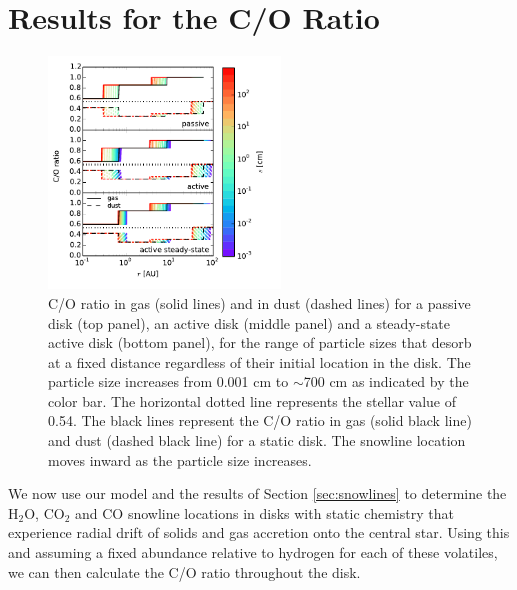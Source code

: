 \documentclass[apj]{emulateapj}
\newcommand{\emgr}[1]{\emph{ \color{gray} #1}}
\begin{document}


\section{Results for the C/O Ratio}
\label{sec:COratio}

\begin{figure}[h!]
\centering
\includegraphics[width=0.55\textwidth]{C_O_ratio_passive_active_disk_many_colorbar_complete.pdf}
\caption{C/O ratio in gas (solid lines) and in dust (dashed lines) for a passive disk (top panel), an active disk (middle panel) and a steady-state active disk (bottom panel), for the range of particle sizes that desorb at a fixed distance regardless of their initial location in the disk. The particle size increases from 0.001 cm to $\sim$700 cm as indicated by the color bar. The horizontal dotted line represents the stellar value of 0.54. The black lines represent the C/O ratio in gas (solid black line) and dust (dashed black line) for a static disk. The snowline location moves inward as the particle size increases.}
\label{fig:CO_ratio}
\end{figure}

We now use our model and the results of Section \ref{sec:snowlines} to determine the H$_2$O, CO$_2$ and CO snowline locations in disks with static chemistry that experience radial drift of solids and gas accretion onto the central star. Using this and assuming a fixed abundance relative to hydrogen for each of these volatiles, we can then calculate the C/O ratio throughout the disk.
\end{document}
